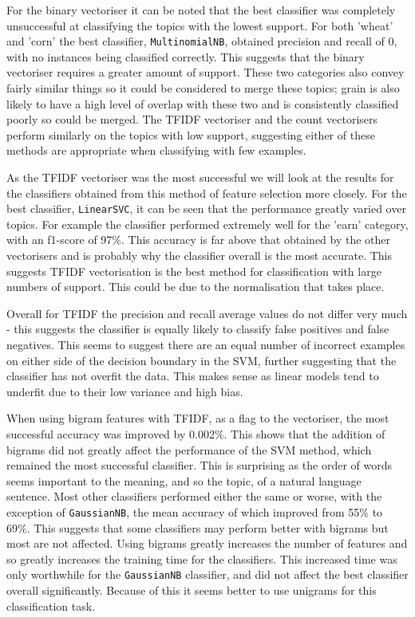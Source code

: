 \documentclass{article}
\begin{document}
For the binary vectoriser it can be noted that the best classifier was completely unsuccessful at classifying the topics with the lowest support. For both 'wheat' and 'corn' the best classifier, \verb|MultinomialNB|, obtained precision and recall of 0, with no instances being classified correctly. This suggests that the binary vectoriser requires a greater amount of support. These two categories also convey fairly similar things so it could be considered to merge these topics; grain is also likely to have a high level of overlap with these two and is consistently classified poorly so could be merged. The TFIDF vectoriser and the count vectorisers perform similarly on the topics with low support, suggesting either of these methods are appropriate when classifying with few examples.

As the TFIDF vectoriser was the most successful we will look at the results for the classifiers obtained from this method of feature selection more closely. For the best classifier, \verb|LinearSVC|, it can be seen that the performance greatly varied over topics. For example the classifier performed extremely well for the 'earn' category, with an f1-score of 97\%. This accuracy is far above that obtained by the other vectorisers and is probably why the classifier overall is the most accurate. This suggests TFIDF vectorisation is the best method for classification with large numbers of support. This could be due to the normalisation that takes place. 

Overall for TFIDF the precision and recall average values do not differ very much - this suggests the classifier is equally likely to classify false positives and false negatives. This seems to suggest there are an equal number of incorrect examples on either side of the decision boundary in the SVM, further suggesting that the classifier has not overfit the data. This makes sense as linear models tend to underfit due to their low variance and high bias.

When using bigram features with TFIDF, as a flag to the vectoriser, the most successful accuracy was improved by 0.002\%. This shows that the addition of bigrams did not greatly affect the performance of the SVM method, which remained the most successful classifier. This is surprising as the order of words seems important to the meaning, and so the topic, of a natural language sentence. Most other classifiers performed either the same or worse, with the exception of \verb|GaussianNB|, the mean accuracy of which improved from 55\% to 69\%. This suggests that some classifiers may perform better with bigrams but most are not affected. Using bigrams greatly increases the number of features and so greatly increases the training time for the classifiers. This increased time was only worthwhile for the \verb|GaussianNB| classifier, and did not affect the best classifier overall significantly. Because of this it seems better to use unigrams for this classification task.
\end{document}
